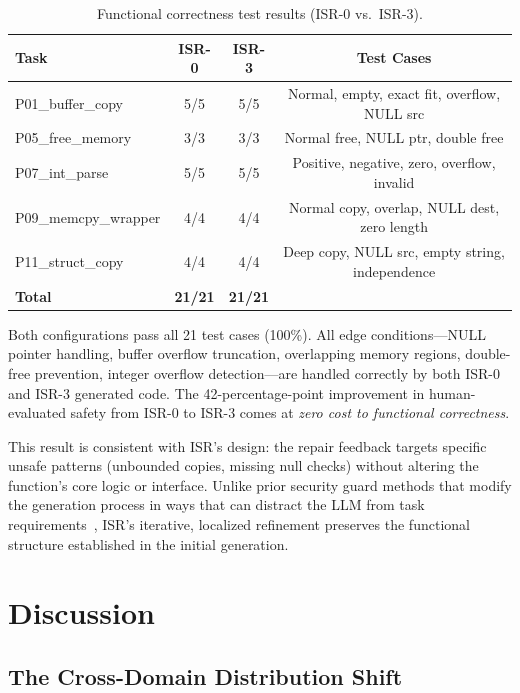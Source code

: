 \documentclass[10pt,conference]{IEEEtran}
\begin{document}
\begin{table}[h]
\centering
\caption{Functional correctness test results (ISR-0 vs.\ ISR-3).}
\label{tab:functional}
\begin{tabular}{lccc}
\toprule
Task & ISR-0 & ISR-3 & Test Cases \\
\midrule
P01\_buffer\_copy & 5/5 & 5/5 & Normal, empty, exact fit, overflow, NULL src \\
P05\_free\_memory & 3/3 & 3/3 & Normal free, NULL ptr, double free \\
P07\_int\_parse & 5/5 & 5/5 & Positive, negative, zero, overflow, invalid \\
P09\_memcpy\_wrapper & 4/4 & 4/4 & Normal copy, overlap, NULL dest, zero length \\
P11\_struct\_copy & 4/4 & 4/4 & Deep copy, NULL src, empty string, independence \\
\midrule
\textbf{Total} & \textbf{21/21} & \textbf{21/21} & \\
\bottomrule
\end{tabular}
\end{table}

Both configurations pass all 21 test cases (100\%). All edge conditions---NULL pointer handling, buffer overflow truncation, overlapping memory regions, double-free prevention, integer overflow detection---are handled correctly by both ISR-0 and ISR-3 generated code. The 42-percentage-point improvement in human-evaluated safety from ISR-0 to ISR-3 comes at \textit{zero cost to functional correctness}.

This result is consistent with ISR's design: the repair feedback targets specific unsafe patterns (unbounded copies, missing null checks) without altering the function's core logic or interface. Unlike prior security guard methods that modify the generation process in ways that can distract the LLM from task requirements~\cite{rethinking}, ISR's iterative, localized refinement preserves the functional structure established in the initial generation.

\section{Discussion}
\label{sec:discussion}

\subsection{The Cross-Domain Distribution Shift}
\end{document}
